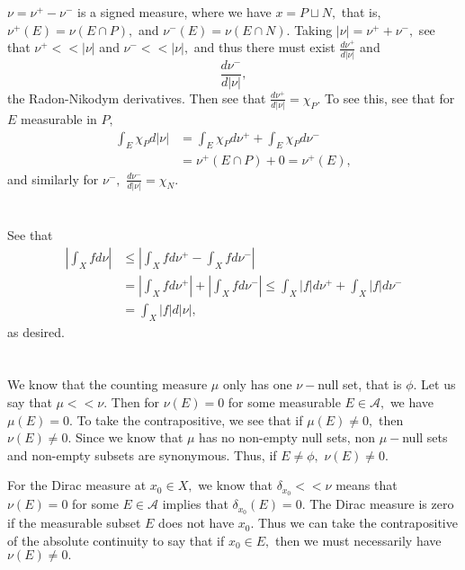 \documentclass{article}
\begin{document}
\section{} %
$\nu=\nu^+-\nu^-$ is a signed measure, where we have $x=P \sqcup N,$ that is, $\nu^+(E)=\nu(E \cap P),$ and $\nu^-(E)=\nu(E \cap N).$
Taking $|\nu|=\nu^+ +\nu^-,$ see that $ \nu^+ << |\nu|$ and $\nu^- << |\nu|,$ and thus there must exist $\frac{d\nu^+}{d|\nu|}$ and 
$$\frac{d\nu^-}{d|\nu|},$$ the Radon-Nikodym derivatives. Then see that $\frac{d\nu^+}{d|\nu|}=\chi_P.$ To see this, see that for $E$ measurable in $P,$
\begin{align*}
	\int_E \chi_{P}d|\nu| &= \int_E \chi_P d\nu^+ + \int_E \chi_P d\nu^-\\
	&= \nu^+(E\cap P)  + 0 = \nu^+(E),
\end{align*}
and similarly for $\nu^-,$ $\frac{d\nu^-}{d|\nu|}=\chi_N.$ 
\section{} %
See that \begin{align*}
	\left| \int_X f d\nu \right| &\leq \left|\int_{X}f d\nu^+ - \int_{X}f d\nu^-  \right|\\
	&= \left|\int_{X}f d\nu^+\right| + \left|\int_{X}f d\nu^-\right| \leq \int_{X}|f| d\nu^+ + \int_{X}|f| d\nu^-\\
	&= \int_{X}|f| d|\nu|,
\end{align*}
as desired. 
\section{} %
We know that the counting measure $\mu$ only has one $\nu-$null set, that is $\phi.$ Let us say that $\mu << \nu.$ Then for $\nu(E)=0$ for some measurable 
$E \in \mathcal{A},$ we have $\mu(E)=0.$ To take the contrapositive, we see that if $\mu(E)\neq 0,$ then $\nu(E) \neq 0.$ Since we know that $\mu$ has no 
non-empty null sets, non $\mu-$null sets and non-empty subsets are synonymous. Thus, if $E \neq \phi,$ $\nu(E) \neq 0.$

For the Dirac measure at $x_0 \in X,$ we know that $\delta_{x_0} << \nu$ means that $\nu(E)=0$ for some $E \in \mathcal{A}$ implies that 
$\delta_{x_0}(E)=0.$ The Dirac measure is zero if the measurable subset $E$ does not have $x_0.$ Thus we can take the contrapositive of the absolute 
continuity to say that if $x_0 \in E,$ then we must necessarily have $\nu(E)\neq 0.$ 
\end{document}
